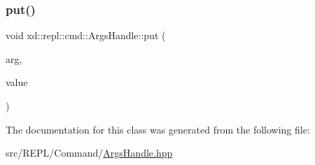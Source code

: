 \mbox{\label{classxd_1_1repl_1_1cmd_1_1_args_handle_a0a6063b4d4c0d7aa54bcc8c0684ec01f}} 
\subsubsection{\texorpdfstring{put()}{put()}}
{\footnotesize\ttfamily void xd\+::repl\+::cmd\+::\+Args\+Handle\+::put (\begin{DoxyParamCaption}\item[{const \mbox{\hyperlink{classxd_1_1repl_1_1cmd_1_1_argument}{Argument}} \&}]{arg,  }\item[{Arg\+Value}]{value }\end{DoxyParamCaption})\hspace{0.3cm}{\ttfamily [inline]}}



The documentation for this class was generated from the following file\+:\begin{DoxyCompactItemize}
\item 
src/\+R\+E\+P\+L/\+Command/\mbox{\hyperlink{_args_handle_8hpp}{Args\+Handle.\+hpp}}\end{DoxyCompactItemize}
